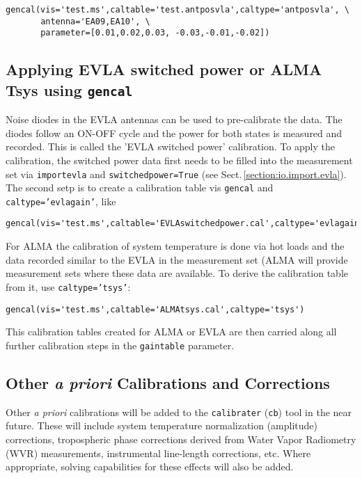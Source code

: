 \small
\begin{verbatim}
gencal(vis='test.ms',caltable='test.antposvla',caltype='antposvla', \
       antenna='EA09,EA10', \
       parameter=[0.01,0.02,0.03, -0.03,-0.01,-0.02])
\end{verbatim}
\normalsize
\subsection{Applying EVLA switched power  or ALMA Tsys
   using {\tt gencal}}
\label{section:cal.prior.gencalevlagains}
Noise diodes in the EVLA antennas can be used to pre-calibrate the
data. The diodes follow an ON-OFF cycle and the power for both states is
measured and recorded. This is called the 'EVLA switched power'
calibration. To apply the calibration, the switched power data first needs to be
filled into the measurement set via {\tt importevla} and {\tt switchedpower=True}
(see Sect.\,\ref{section:io.import.evla}). The second setp is to
create a calibration table vis {\tt gencal} and {\tt
  caltype='evlagain'}, like 

\small
\begin{verbatim}
gencal(vis='test.ms',caltable='EVLAswitchedpower.cal',caltype='evlagain')
\end{verbatim}
\normalsize

For ALMA the calibration of system temperature is done via hot loads
and the data recorded similar to the EVLA in the measurement set (ALMA
will provide measurement sets where these data are available. To
derive the calibration table from it, use {\tt caltype='tsys'}:

\small
\begin{verbatim}
gencal(vis='test.ms',caltable='ALMAtsys.cal',caltype='tsys')
\end{verbatim}
\normalsize


This calibration tables created for ALMA or EVLA are then carried
along all further calibration steps in the {\tt gaintable} parameter.


\subsection{Other {\it a priori} Calibrations and Corrections}
\label{section:cal.prior.other}

Other {\it a priori} calibrations will be added to the 
{\tt calibrater} ({\tt cb}) tool 
in the near future.  These will include
system temperature normalization (amplitude) corrections,
tropospheric phase corrections derived from Water Vapor Radiometry
(WVR) measurements, instrumental line-length corrections, etc.  Where
appropriate, solving capabilities for these effects will also be
added.


